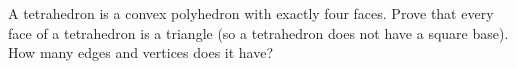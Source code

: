 A tetrahedron is a convex polyhedron with exactly four faces. Prove that every face of a tetrahedron is a triangle (so a tetrahedron does not have a square base). How many edges and vertices does it have?
